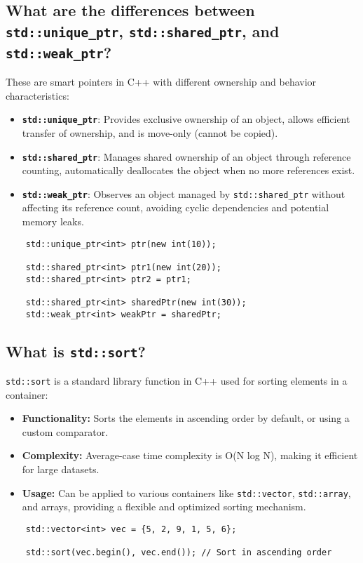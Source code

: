 \subsection{What are the differences between \texttt{std::unique\_ptr}, \texttt{std::shared\_ptr}, and \texttt{std::weak\_ptr}?}
These are smart pointers in C++ with different ownership and behavior characteristics: \\
\begin{itemize}
    \item \textbf{\texttt{std::unique\_ptr}}: Provides exclusive ownership of an object, allows efficient transfer of ownership, and is move-only (cannot be copied).
    \item \textbf{\texttt{std::shared\_ptr}}: Manages shared ownership of an object through reference counting, automatically deallocates the object when no more references exist.
    \item \textbf{\texttt{std::weak\_ptr}}: Observes an object managed by \texttt{std::shared\_ptr} without affecting its reference count, avoiding cyclic dependencies and potential memory leaks.
\end{itemize}
\begin{tcolorbox}[title=Smart Pointers]
\begin{verbatim}
    std::unique_ptr<int> ptr(new int(10));
   
    std::shared_ptr<int> ptr1(new int(20));
    std::shared_ptr<int> ptr2 = ptr1;
   
    std::shared_ptr<int> sharedPtr(new int(30));
    std::weak_ptr<int> weakPtr = sharedPtr;
\end{verbatim}
\end{tcolorbox}

\subsection{What is \texttt{std::sort}?}
\texttt{std::sort} is a standard library function in C++ used for sorting elements in a container:
\begin{itemize}
    \item \textbf{Functionality:} Sorts the elements in ascending order by default, or using a custom comparator.
    \item \textbf{Complexity:} Average-case time complexity is O(N log N), making it efficient for large datasets.
    \item \textbf{Usage:} Can be applied to various containers like \texttt{std::vector}, \texttt{std::array}, and arrays, providing a flexible and optimized sorting mechanism.
\end{itemize}
\begin{tcolorbox}[title=\texttt{std::sort} Example]
\begin{verbatim}
    std::vector<int> vec = {5, 2, 9, 1, 5, 6};

    std::sort(vec.begin(), vec.end()); // Sort in ascending order
\end{verbatim}
\end{tcolorbox}

